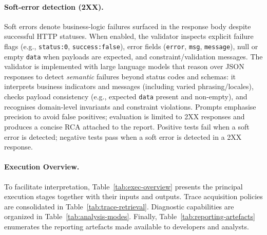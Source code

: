 \documentclass[conference]{IEEEtran}
\begin{document}
\paragraph{Soft-error detection (2XX).}
Soft errors denote business-logic failures surfaced in the response body despite successful HTTP statuses. When enabled, the validator inspects explicit failure flags (e.g., \texttt{status:0}, \texttt{success:false}), error fields (\texttt{error}, \texttt{msg}, \texttt{message}), null or empty \texttt{data} when payloads are expected, and constraint/validation messages. The validator is implemented with large language models that reason over JSON responses to detect \emph{semantic} failures beyond status codes and schemas: it interprets business indicators and messages (including varied phrasing/locales), checks payload consistency (e.g., expected \texttt{data} present and non-empty), and recognises domain-level invariants and constraint violations. Prompts emphasise precision to avoid false positives; evaluation is limited to 2XX responses and produces a concise RCA attached to the report. Positive tests fail when a soft error is detected; negative tests pass when a soft error is detected in a 2XX response.

\paragraph{Execution Overview.}
To facilitate interpretation, Table~\ref{tab:exec-overview} presents the principal execution stages together with their inputs and outputs. Trace acquisition policies are consolidated in Table~\ref{tab:trace-retrieval}. Diagnostic capabilities are organized in Table~\ref{tab:analysis-modes}. Finally, Table~\ref{tab:reporting-artefacts} enumerates the reporting artefacts made available to developers and analysts.
\end{document}
